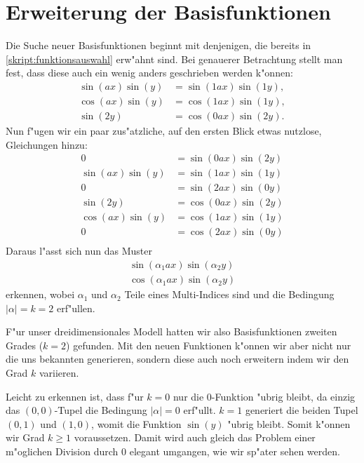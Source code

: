 \section{Erweiterung der Basisfunktionen\label{section:lorenz2:basic_function}}
Die Suche neuer Basisfunktionen beginnt mit denjenigen, die bereits 
in \cref{skript:funktionsauswahl} erw"ahnt sind. Bei genauerer Betrachtung 
stellt man fest, dass diese auch ein wenig anders geschrieben werden k"onnen:
\begin{align*}
\sin(ax)\sin(y) &= \sin(1ax)\sin(1y),\\
\cos(ax)\sin(y) &= \cos(1ax)\sin(1y),\\
\sin(2y) &= \cos(0ax)\sin(2y).
\end{align*}
Nun f"ugen wir ein paar zus"atzliche, auf den ersten Blick etwas nutzlose, 
Gleichungen hinzu:
\begin{align*}
0 &= \sin(0ax)\sin(2y) \\
\sin(ax)\sin(y) &= \sin(1ax)\sin(1y)\\
0 &= \sin(2ax)\sin(0y) \\
\sin(2y) &= \cos(0ax)\sin(2y)\\
\cos(ax)\sin(y) &= \cos(1ax)\sin(1y)\\
0 &= \cos(2ax)\sin(0y)\\
\end{align*}
Daraus l"asst sich nun das Muster
\begin{equation}
\begin{split}
\sin(\alpha_1 ax)\sin(\alpha_2 y) \\
\cos(\alpha_1 ax)\sin(\alpha_2 y)
\end{split}
\label{equation:lorenz2:basic-functions}
\end{equation}
erkennen, wobei $\alpha_1$ und $\alpha_2$ Teile eines Multi-Indices sind und 
die Bedingung $|\alpha| = k = 2$ erf"ullen.

F"ur unser dreidimensionales Modell hatten wir also Basisfunktionen zweiten 
Grades ($k = 2$) gefunden. Mit den neuen Funktionen k"onnen wir aber nicht nur 
die uns bekannten generieren, sondern diese auch noch erweitern indem wir den 
Grad $k$ variieren.

Leicht zu erkennen ist, dass f"ur $k = 0$ nur die $0$-Funktion 
"ubrig bleibt, da einzig das $(0, 0)$-Tupel die Bedingung $|\alpha| = 0$ 
erf"ullt. $k = 1$ generiert die beiden Tupel $(0, 1)$ und $(1, 0)$, womit die 
Funktion $\sin(y)$ "ubrig bleibt. Somit k"onnen wir Grad $k \geq 1$ 
voraussetzen. Damit wird auch gleich das Problem einer m"oglichen Division 
durch $0$ elegant umgangen, wie wir sp"ater sehen werden.
